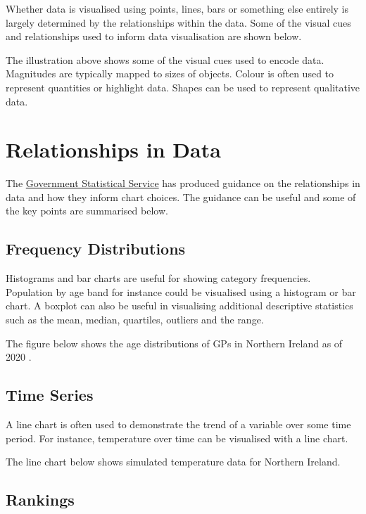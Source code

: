 \documentclass[
]{book}
\begin{document}
Whether data is visualised using points, lines, bars or something else entirely is largely determined by the relationships within the data. Some of the visual cues and relationships used to inform data visualisation are shown below.

The illustration above shows some of the visual cues used to encode data. Magnitudes are typically mapped to sizes of objects. Colour is often used to represent quantities or highlight data. Shapes can be used to represent qualitative data.

\hypertarget{relationships-in-data}{%
\section{Relationships in Data}\label{relationships-in-data}}

The \href{https://analysisfunction.civilservice.gov.uk/policy-store/data-visualisation-charts/\#section-9}{Government Statistical Service} has produced guidance on the relationships in data and how they inform chart choices. The guidance can be useful and some of the key points are summarised below.

\hypertarget{frequency-distributions}{%
\subsection{Frequency Distributions}\label{frequency-distributions}}

Histograms and bar charts are useful for showing category frequencies. Population by age band for instance could be visualised using a histogram or bar chart. A boxplot can also be useful in visualising additional descriptive statistics such as the mean, median, quartiles, outliers and the range.

The figure below shows the age distributions of GPs in Northern Ireland as of 2020 \citep{family}.

\hypertarget{time-series}{%
\subsection{Time Series}\label{time-series}}

A line chart is often used to demonstrate the trend of a variable over some time period. For instance, temperature over time can be visualised with a line chart.

The line chart below shows simulated temperature data for Northern Ireland.

\hypertarget{rankings}{%
\subsection{Rankings}\label{rankings}}
\end{document}
